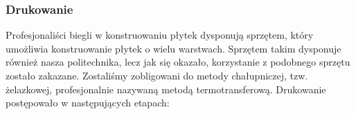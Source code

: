 \subsubsection{Drukowanie}

Profesjonaliści biegli w konstruowaniu płytek dysponują sprzętem, który umożliwia konstruowanie płytek o wielu warstwach. Sprzętem takim dysponuje również nasza politechnika, lecz jak się okazało, korzystanie z podobnego sprzętu zostało zakazane. Zostaliśmy zobligowani do metody chałupniczej, tzw. żelazkowej, profesjonalnie nazywaną metodą termotransferową. Drukowanie postępowało w następujących etapach: 


